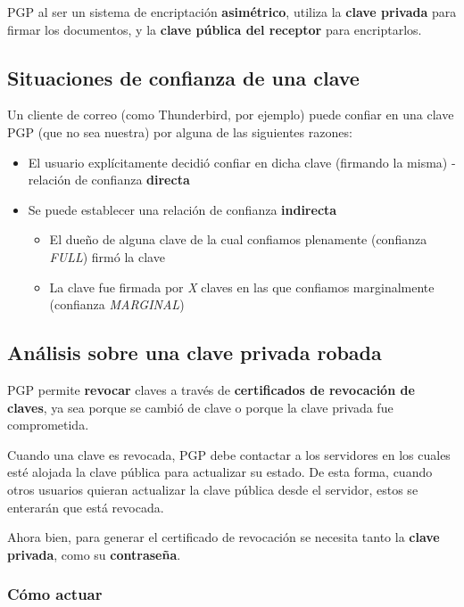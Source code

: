 PGP al ser un sistema de encriptación \textbf{asimétrico}, utiliza la \textbf{clave privada} para firmar los documentos, y la \textbf{clave pública del receptor} para encriptarlos.   

\subsection{Situaciones de confianza de una clave}

Un cliente de correo (como Thunderbird, por ejemplo) puede confiar en una clave PGP (que no sea nuestra) por alguna de las siguientes razones:

\begin{itemize}
    \item El usuario explícitamente decidió confiar en dicha clave (firmando la misma) - relación de confianza \textbf{directa} 
    \item Se puede establecer una relación de confianza \textbf{indirecta}
    \begin{itemize}
        \item El dueño de alguna clave de la cual confiamos plenamente (confianza \emph{FULL}) firmó la clave
        \item La clave fue firmada por \emph{X} claves en las que confiamos marginalmente (confianza \emph{MARGINAL}) 
    \end{itemize}
\end{itemize}


\subsection{Análisis sobre una clave privada robada}

PGP permite \textbf{revocar} claves a través de \textbf{certificados de revocación de claves}, ya sea porque se cambió de clave o porque la clave privada fue comprometida. 

Cuando una clave es revocada, PGP debe contactar a los servidores en los cuales esté alojada la clave pública para actualizar su estado. De esta forma, cuando otros usuarios quieran actualizar la clave pública desde el servidor, estos se enterarán que está revocada.

Ahora bien, para generar el certificado de revocación se necesita tanto la \textbf{clave privada}, como su \textbf{contraseña}. 

\subsubsection{Cómo actuar}

